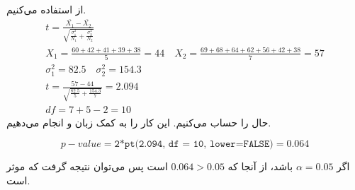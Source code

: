 از
استفاده می‌کنیم.
\begin{gather*}
    t = \frac{\bar{X_1} - \bar{X_2}}{\sqrt{\frac{\sigma^2_1}{N_1}+\frac{\sigma^2_2}{N_2}}}\\
    X_1 = \frac{60 + 42 + 41 + 39 + 38}{5} = 44 \quad X_2 = \frac{69 + 68 + 64 + 62 + 56 + 42 + 38}{7} = 57\\
    \sigma_1^2 = 82.5 \quad \sigma_2^2 = 154.3\\
    t = \frac{57 - 44}{\sqrt{\frac{82.5}{5} +\frac{154.3}{7}}} = 2.094\\
    df = 7 + 5 - 2 = 10
\end{gather*}
حال
را حساب می‌کنیم. این کار را به کمک زبان
و
انجام می‌دهیم.
\begin{latin}
    \[ %
        p-value = \texttt{2*pt(2.094, df = 10, lower=FALSE)} = 0.064
    \]
\end{latin}
اگر
$\alpha = 0.05$
باشد، از آنجا که
$0.064 > 0.05$
است پس می‌توان نتیجه گرفت که موثر است.



